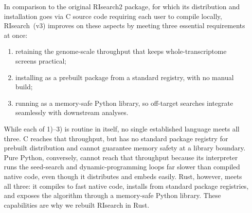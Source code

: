 \documentclass[unnumsec,webpdf,contemporary,large]{oup-authoring-template}
\begin{document}
In comparison to the original RIsearch2 package, for which its distribution and installation goes via C source code requiring each user to compile locally,
RIsearch~(v3) improves on these aspects by meeting three essential requirements at once:
\begin{enumerate}
\item retaining the genome-scale throughput that keeps whole-transcriptome screens practical;
\item installing as a prebuilt package from a standard registry, with no manual build;
\item running as a memory-safe Python library, so off-target searches integrate seamlessly with downstream analyses.
\end{enumerate}
While each of 1)--3) is routine in itself, no single established language meets all three.
C reaches that throughput, but has no standard package registry for prebuilt distribution and cannot guarantee memory safety at a library boundary.
Pure Python, conversely, cannot reach that throughput because its interpreter runs the seed-search and dynamic-programming loops far slower than compiled native code, even though it distributes and embeds easily.
Rust, however, meets all three: it compiles to fast native code, installs from standard package registries, and exposes the algorithm through a memory-safe Python library.
These capabilities are why we rebuilt RIsearch in Rust.
\end{document}
